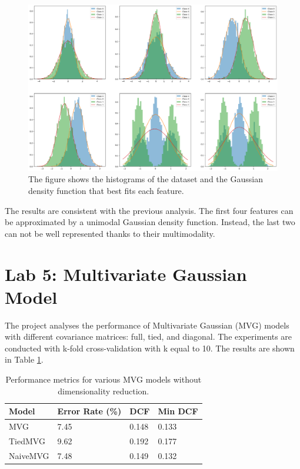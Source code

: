 \documentclass{article}
\begin{document}
\begin{figure}[ht]
    \centering
    \includegraphics[width=\textwidth]{images/dataset_gaussian.png}
    \caption{The figure shows the histograms of the dataset and the Gaussian density function that best fits each feature.}
    \label{fig:dataset_gaussian}
\end{figure}

The results are consistent with the previous analysis. The first four features can be approximated by a unimodal Gaussian density function. Instead, the last two can not be well represented thanks to their multimodality.


\section{Lab 5: Multivariate Gaussian Model}

The project analyses the performance of Multivariate Gaussian (MVG) models with different covariance matrices: full, tied, and diagonal. The experiments are conducted with k-fold cross-validation with k equal to 10. The results are shown in Table \ref{tab:mvg_performance}.

\begin{table}[ht!]
    \centering
    \begin{tabularx}{\textwidth}{lXXX}
        \toprule
        \textbf{Model} & \textbf{Error Rate (\%)} & \textbf{DCF} & \textbf{Min DCF} \\
        \midrule
        MVG      & 7.45 & 0.148 & 0.133 \\
        TiedMVG  & 9.62 & 0.192 & 0.177 \\
        NaiveMVG & 7.48 & 0.149 & 0.132 \\
        \bottomrule
    \end{tabularx}
    \caption{Performance metrics for various MVG models without dimensionality reduction.}
    \label{tab:mvg_performance}
\end{table}
\end{document}
